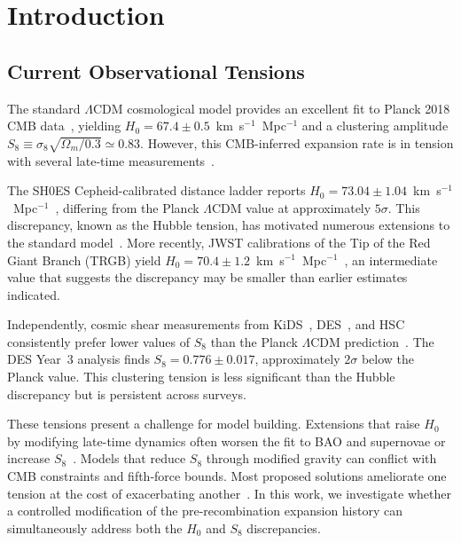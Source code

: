 \documentclass[a4paper,11pt]{article}
\begin{document}

\section{Introduction}

\subsection{Current Observational Tensions}

The standard $\Lambda$CDM cosmological model provides an excellent fit to Planck 2018 CMB data~\cite{Planck2018,Planck2018_params}, yielding $H_0 = 67.4 \pm 0.5$~km~s$^{-1}$~Mpc$^{-1}$ and a clustering amplitude $S_8 \equiv \sigma_8 \sqrt{\Omega_m/0.3} \simeq 0.83$. However, this CMB-inferred expansion rate is in tension with several late-time measurements~\cite{Kamionkowski_Riess,DiValentino_review}.

The SH0ES Cepheid-calibrated distance ladder reports $H_0 = 73.04 \pm 1.04$~km~s$^{-1}$~Mpc$^{-1}$~\cite{SH0ES}, differing from the Planck $\Lambda$CDM value at approximately $5\sigma$. This discrepancy, known as the Hubble tension, has motivated numerous extensions to the standard model~\cite{Knox_Millea}. More recently, JWST calibrations of the Tip of the Red Giant Branch (TRGB) yield $H_0 = 70.4 \pm 1.2$~km~s$^{-1}$~Mpc$^{-1}$~\cite{Freedman2024}, an intermediate value that suggests the discrepancy may be smaller than earlier estimates indicated.

Independently, cosmic shear measurements from KiDS~\cite{KiDS1000}, DES~\cite{DES_Y3}, and HSC~\cite{HSC_Y3} consistently prefer lower values of $S_8$ than the Planck $\Lambda$CDM prediction~\cite{DiValentino_S8}. The DES Year~3 analysis finds $S_8 = 0.776 \pm 0.017$, approximately $2\sigma$ below the Planck value. This clustering tension is less significant than the Hubble discrepancy but is persistent across surveys.

These tensions present a challenge for model building. Extensions that raise $H_0$ by modifying late-time dynamics often worsen the fit to BAO and supernovae or increase $S_8$~\cite{Mortsell_Dhawan}. Models that reduce $S_8$ through modified gravity can conflict with CMB constraints and fifth-force bounds. Most proposed solutions ameliorate one tension at the cost of exacerbating another~\cite{Verde_H0}. In this work, we investigate whether a controlled modification of the pre-recombination expansion history can simultaneously address both the $H_0$ and $S_8$ discrepancies.
\end{document}
